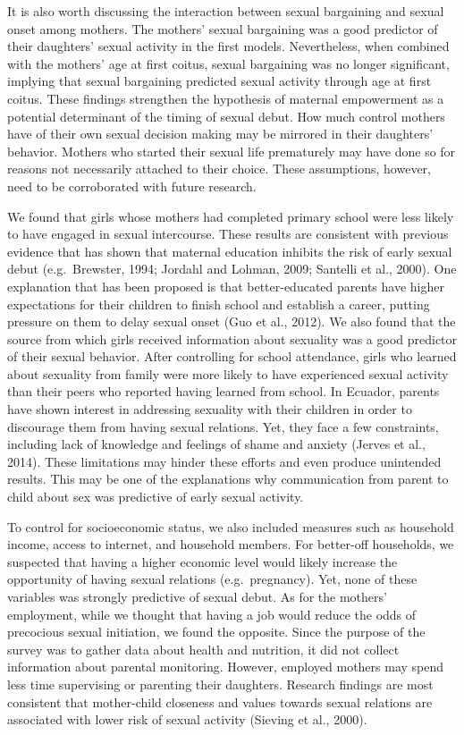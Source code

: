 \documentclass[
]{article}
\begin{document}
It is also worth discussing the interaction between sexual bargaining
and sexual onset among mothers. The mothers' sexual bargaining was a
good predictor of their daughters' sexual activity in the first models.
Nevertheless, when combined with the mothers' age at first coitus,
sexual bargaining was no longer significant, implying that sexual
bargaining predicted sexual activity through age at first coitus. These
findings strengthen the hypothesis of maternal empowerment as a
potential determinant of the timing of sexual debut. How much control
mothers have of their own sexual decision making may be mirrored in
their daughters' behavior. Mothers who started their sexual life
prematurely may have done so for reasons not necessarily attached to
their choice. These assumptions, however, need to be corroborated with
future research.

We found that girls whose mothers had completed primary school were less
likely to have engaged in sexual intercourse. These results are
consistent with previous evidence that has shown that maternal education
inhibits the risk of early sexual debut (e.g.~Brewster, 1994; Jordahl
and Lohman, 2009; Santelli et al., 2000). One explanation that has been
proposed is that better-educated parents have higher expectations for
their children to finish school and establish a career, putting pressure
on them to delay sexual onset (Guo et al., 2012). We also found that the
source from which girls received information about sexuality was a good
predictor of their sexual behavior. After controlling for school
attendance, girls who learned about sexuality from family were more
likely to have experienced sexual activity than their peers who reported
having learned from school. In Ecuador, parents have shown interest in
addressing sexuality with their children in order to discourage them
from having sexual relations. Yet, they face a few constraints,
including lack of knowledge and feelings of shame and anxiety (Jerves et
al., 2014). These limitations may hinder these efforts and even produce
unintended results. This may be one of the explanations why
communication from parent to child about sex was predictive of early
sexual activity.

To control for socioeconomic status, we also included measures such as
household income, access to internet, and household members. For
better-off households, we suspected that having a higher economic level
would likely increase the opportunity of having sexual relations
(e.g.~pregnancy). Yet, none of these variables was strongly predictive
of sexual debut. As for the mothers' employment, while we thought that
having a job would reduce the odds of precocious sexual initiation, we
found the opposite. Since the purpose of the survey was to gather data
about health and nutrition, it did not collect information about
parental monitoring. However, employed mothers may spend less time
supervising or parenting their daughters. Research findings are most
consistent that mother-child closeness and values towards sexual
relations are associated with lower risk of sexual activity (Sieving et
al., 2000).
\end{document}

